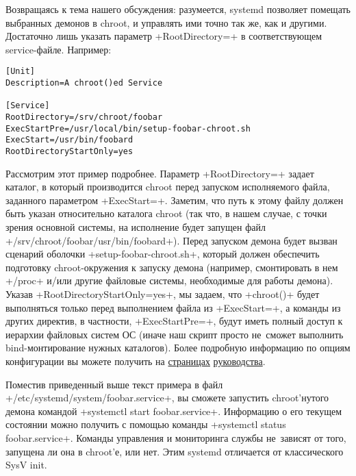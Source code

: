 \documentclass[10pt,oneside,a4paper]{article}
\begin{document}
Возвращаясь к тема нашего обсуждения: разумеется, systemd позволяет помещать
выбранных демонов в chroot, и управлять ими точно так же, как и другими.
Достаточно лишь указать параметр +RootDirectory=+ в соответствующем
service-файле. Например:
\begin{Verbatim}
[Unit]
Description=A chroot()ed Service

[Service]
RootDirectory=/srv/chroot/foobar
ExecStartPre=/usr/local/bin/setup-foobar-chroot.sh
ExecStart=/usr/bin/foobard
RootDirectoryStartOnly=yes
\end{Verbatim}

Рассмотрим этот пример подробнее. Параметр +RootDirectory=+ задает каталог, в
который производится chroot перед запуском исполняемого файла, заданного
параметром +ExecStart=+. Заметим, что путь к этому файлу должен быть указан
относительно каталога chroot (так что, в нашем случае, с точки зрения основной
системы, на исполнение будет запущен файл +/srv/chroot/foobar/usr/bin/foobard+).
Перед запуском демона будет вызван сценарий оболочки +setup-foobar-chroot.sh+,
который должен обеспечить подготовку chroot-окружения к запуску демона
(например, смонтировать в нем +/proc+ и/или другие файловые системы, необходимые
для работы демона). Указав +RootDirectoryStartOnly=yes+, мы задаем, что
+chroot()+ будет выполняться только перед выполнением файла из +ExecStart=+, а
команды из других директив, в частности, +ExecStartPre=+, будут иметь полный
доступ к иерархии файловых систем ОС (иначе наш скрипт просто не~сможет
выполнить bind-монтирование нужных каталогов). Более подробную информацию по
опциям конфигурации вы можете получить на
\href{http://0pointer.de/public/systemd-man/systemd.service.html}{страницах}
\href{http://0pointer.de/public/systemd-man/systemd.exec.html}{руководства}.

Поместив приведенный выше текст примера в файл
+/etc/systemd/system/foobar.service+, вы сможете запустить chroot'нутого демона
командой +systemctl start foobar.service+. Информацию о его текущем состоянии
можно получить с помощью команды +systemctl status foobar.service+. Команды
управления и мониторинга службы не~зависят от того, запущена ли она в chroot'е,
или нет. Этим systemd отличается от классического SysV init.
\end{document}
